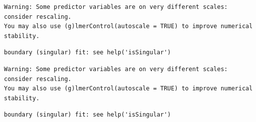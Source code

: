 \documentclass[
  landscape]{article}
\newenvironment{Shaded}{\begin{snugshade}}{\end{snugshade}}
\newcommand{\AttributeTok}[1]{\textcolor[rgb]{0.13,0.29,0.53}{#1}}
\newcommand{\CommentTok}[1]{\textcolor[rgb]{0.56,0.35,0.01}{\textit{#1}}}
\newcommand{\ControlFlowTok}[1]{\textcolor[rgb]{0.13,0.29,0.53}{\textbf{#1}}}
\newcommand{\DecValTok}[1]{\textcolor[rgb]{0.00,0.00,0.81}{#1}}
\newcommand{\FunctionTok}[1]{\textcolor[rgb]{0.13,0.29,0.53}{\textbf{#1}}}
\newcommand{\NormalTok}[1]{#1}
\newcommand{\OtherTok}[1]{\textcolor[rgb]{0.56,0.35,0.01}{#1}}
\newcommand{\SpecialCharTok}[1]{\textcolor[rgb]{0.81,0.36,0.00}{\textbf{#1}}}
\newcommand{\StringTok}[1]{\textcolor[rgb]{0.31,0.60,0.02}{#1}}
\begin{document}
\begin{Shaded}
\end{Shaded}

\begin{verbatim}
Warning: Some predictor variables are on very different scales: consider rescaling. 
You may also use (g)lmerControl(autoscale = TRUE) to improve numerical stability.
\end{verbatim}

\begin{verbatim}
boundary (singular) fit: see help('isSingular')
\end{verbatim}

\begin{verbatim}
Warning: Some predictor variables are on very different scales: consider rescaling. 
You may also use (g)lmerControl(autoscale = TRUE) to improve numerical stability.
\end{verbatim}

\begin{verbatim}
boundary (singular) fit: see help('isSingular')
\end{verbatim}
\end{document}
